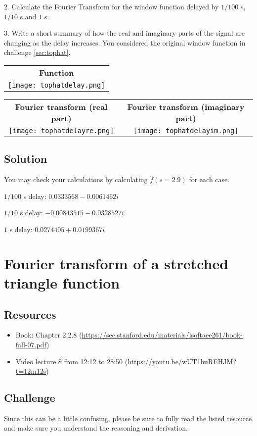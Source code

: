 2. Calculate the Fourier Transform for the window function delayed by $1/100$ s, $1/10$ s and $1$ s.

3. Write a short summary of how the real and imaginary parts of the signal are changing as the delay increases. You considered the original window function in challenge \ref{sec:tophat}.

\begin{tabular}{c}
    \textbf{Function} \\
    \texttt{[image: tophatdelay.png]}
\end{tabular}

\begin{tabular}{cc}
    \textbf{Fourier transform (real part)} & \textbf{Fourier transform (imaginary part)}\\
    \texttt{[image: tophatdelayre.png]} & \texttt{[image: tophatdelayim.png]}
\end{tabular}

\subsection*{Solution}
You may check your calculations by calculating $\hat{f}(s=2.9)$ for each case.

$1/100$ s delay: $0.0333568 - 0.0061462i$

$1/10$ s delay: $-0.00843515 - 0.0328527i$

$1$ s delay: $0.0274405 + 0.0199367i$




\newpage
\section{Fourier transform of a stretched triangle function}

\subsection*{Resources}
\begin{itemize}
    \item Book: Chapter 2.2.8 (\url{https://see.stanford.edu/materials/lsoftaee261/book-fall-07.pdf})
    \item Video lecture 8 from 12:12 to 28:50 (\url{https://youtu.be/wUT1huREHJM?t=12m12s})
\end{itemize}

\subsection*{Challenge}
Since this can be a little confusing, please be sure to fully read the listed resource and make sure you understand the reasoning and derivation.

